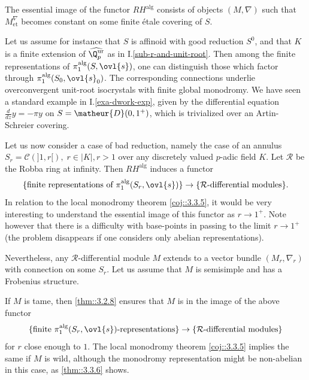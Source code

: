 \begin{para}\label{para::3.5.3} The essential image of the functor
 $RH^{\mathrm{alg}}$ consists of objects $(M,\nabla)$ such that
 $M_{\mathrm{et}}^\nabla$ becomes constant on some finite \'etale
 covering of $S$.

 Let us assume for instance that $S$ is affinoid with good reduction
 $S^0$, and that $K$ is a finite extension of
 $\widehat{\Q_p^{\mathrm{ur}}}$ as in 
 I.\ref{sub-r-and-unit-root}. Then among the finite representations of $
 \pi_1^{\mathrm{alg}}(S, \ovl{s}) $, one can distinguish those which
 factor through $ \pi_1^{\mathrm{alg}}(S_0, \ovl{s}_0) $. The
 corresponding connections underlie overconvergent unit-root isocrystals
 with finite global monodromy. We have seen a standard example in
 I.\ref{exa-dwork-exp}, given by the differential equation
 $\frac{d}{dz} y = -\pi y$ 
 on $S=\matheur{D}(0,1^+)$, which is trivialized over an Artin-Schreier covering.
 
 Let us now consider a case of bad reduction, namely the case of an
 annulus $S_r=\mathcal{C}(]1,r[),\;r\in | K|, 
 r>1$ over any discretely valued $p$-adic field $K$. Let $\mathcal{R}$ be
 the Robba ring at infinity. Then $RH^{\mathrm{alg}}$ induces a 
 functor
 \begin{equation*}
  \{\text{finite representations of $\pi_1^{\mathrm{alg}}(S_r,
   \ovl{s})$}\}
   \to \{\text{$\mathcal{R}$-differential modules}\}.
 \end{equation*}
 In relation to the local monodromy theorem \ref{coj::3.3.5}, it would be very
 interesting to understand the essential image of this functor as $r\to
1^+$. Note however that there is a difficulty with base-points in
passing to the limit $r\to 1^+$ (the problem disappears if one considers
only abelian representations).

Nevertheless, any $\mathcal{R}$-differential module $M$ extends to a
vector bundle $(M_r,\nabla_r)$ with connection on some $S_r$. Let us
assume that $M$ is semisimple and has a Frobenius structure.

If $M$ is tame, then \ref{thm::3.2.8} ensures that $M$ is in the image
of the above functor
\begin{equation*}
 \{\text{finite $\pi_1^{\mathrm{alg}}(S_r, \ovl{s})$-representations}
  \}\to \{\text{$\mathcal{R}$-differential modules}\}
\end{equation*}
for $r$ close enough to
$1$. The local monodromy theorem \ref{coj::3.3.5} implies the same if
$M$ is wild, 
although the monodromy representation might be non-abelian in this case,
as \ref{thm::3.3.6} shows.
\end{para}

